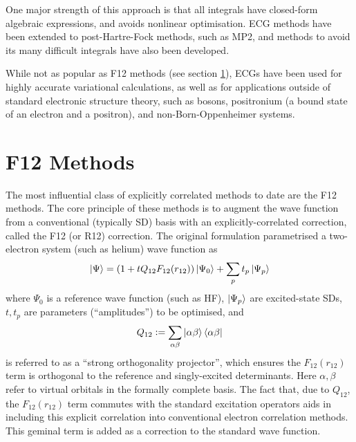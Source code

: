 One major strength of this approach is that all integrals have closed-form algebraic expressions,\cite{lesterGaussian1964} and avoids nonlinear optimisation.\cite{bukowskiNew1994,perssonAccurate1996} \Gls{ECG} methods have been extended to post-Hartre-Fock methods, such as MP2,\cite{panGaussian1970,panElectron1972} and methods to avoid its many difficult integrals have also been developed.\cite{szalewiczNew1982,szalewiczAtomic1983,wenzelAtomic1986,szalewiczAtomic1984,tewWeak2007}

While not as popular as F12 methods (see section \ref{sec:f12}), \glspl{ECG} have been used for highly accurate variational calculations,\cite{korobovCoulomb2000} as well as for applications outside of standard electronic structure theory, such as bosons,\cite{vargaPrecise1995} positronium (a bound state of an electron and a positron),\cite{bubinGroundstate2011} and non-Born-Oppenheimer systems.\cite{stankeNonBornOppenheimer2009}

\section{F12 Methods}
\label{sec:f12}

The most influential class of explicitly correlated methods to date are the F12 methods. The core principle of these methods is to augment the wave function from a conventional (typically \gls{SD}) basis with an explicitly-correlated correction, called the F12 (or R12) correction. The original formulation\supercite{kutzelnigg12Dependent1985} parametrised a two-electron system (such as helium) wave function as
\begin{equation}
    \label{eq:first-r12}
    \ket\Psi = (1+tQ_{12}F_{12}(r_{12}))\ket{\Psi_0}+\sum_{p}t_{p}\ket{\Psi_{p}}
\end{equation}
where $\Psi_0$ is a reference wave function (such as \gls{HF}), $\ket{\Psi_{p}}$ are excited-state \glspl{SD}, $t,t_{p}$ are parameters (``amplitudes'') to be optimised, and
\begin{equation}
    Q_{12} \mathrel{\mathop:}= \sum_{\alpha\beta}\ket{\alpha\beta}\bra{\alpha\beta}
\end{equation}
is referred to as a ``strong orthogonality projector'', which ensures the $F_{12}(r_{12})$ term is orthogonal to the reference and singly-excited determinants.
Here $\alpha,\beta$ refer to virtual orbitals in the formally complete basis. The fact that, due to $Q_{12}$, the $F_{12}(r_{12})$ term commutes with the standard excitation operators aids in including this explicit correlation into conventional electron correlation methods. This geminal term is added as a correction to the standard wave function.

